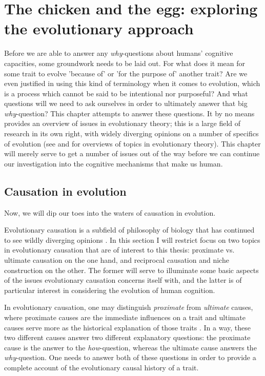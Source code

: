 \chapter{The chicken and the egg: exploring the evolutionary approach}


Before we are able to answer any \emph{why}-questions about humans' cognitive capacities, some groundwork needs to be laid out. For what does it mean for some trait to evolve 'because of' or 'for the purpose of' another trait? Are we even justified in using this kind of terminology when it comes to evolution, which is a process which cannot be said to be intentional nor purposeful? And what questions will we need to ask ourselves in order to ultimately answer that big  \emph{why}-question?
This chapter attempts to answer these questions. It by no means provides an overview of issues in evolutionary theory; this is a large field of research in its own right, with widely diverging opinions on a number of specifics of evolution (see \citet{Ariew02} and \citet{UllerLaland19} for overviews of topics in evolutionary theory).
This chapter will merely serve to get a number of issues out of the way before we can continue our investigation into the cognitive mechanisms that make us human.

\section{Causation in evolution}
\label{sec:causation-evolution}

Now, we will dip our toes into the waters of causation in evolution.

Evolutionary causation is a subfield of philosophy of biology that has continued to see wildly diverging opinions \citep{Baedke2021, UllerLaland19}. In this section I will restrict focus on two topics in evolutionary causation that are of interest to this thesis: proximate vs. ultimate causation on the one hand, and reciprocal causation and niche construction on the other.
The former will serve to illuminate some basic aspects of the issues evolutionary causation concerns itself with, and the latter is of particular interest in considering the evolution of human cognition.

In evolutionary causation, one may distinguish \emph{proximate} from \emph{ultimate} causes, where proximate causes are the immediate influences on a trait and ultimate causes serve more as the historical explanation of those traits \citep{Mayr61}. In a way, these two different causes answer two different explanatory questions: the proximate cause is the answer to the \emph{how}-question, whereas the ultimate cause answers the \emph{why}-question. One needs to answer both of these questions in order to provide a complete account of the evolutionary causal history of a trait.


